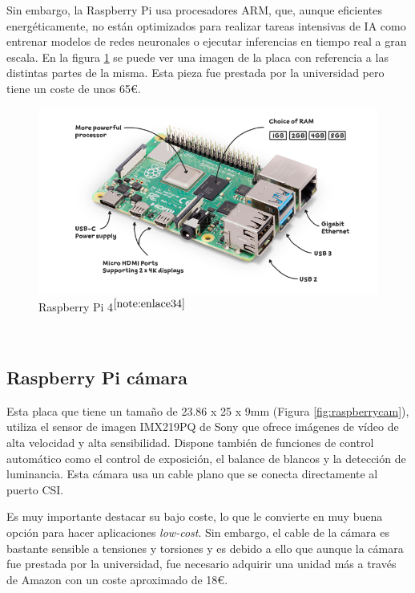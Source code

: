  Sin embargo, la Raspberry Pi usa procesadores ARM, que, aunque eficientes energéticamente, no están optimizados para realizar tareas intensivas de \ac{IA} como entrenar modelos de redes neuronales o ejecutar inferencias en tiempo real a gran escala. En la figura \ref{fig:raspberry} se puede ver una imagen de la placa con referencia a las distintas partes de la misma. Esta pieza fue prestada por la universidad pero tiene un coste de unos 65€. 


\begin{figure} [h!]
	\begin{center}
		\includegraphics[width=14cm]{figs/raspberrypi4.png}
	\end{center}
	\caption{Raspberry Pi 4$^{\ref{note:enlace34}}$} 
\label{fig:raspberry}
\end{figure}\

\setcounter{footnote}{34} %

\subsection{Raspberry Pi cámara}

Esta placa que tiene un tamaño de  23.86 x 25 x 9mm (Figura \ref{fig:raspberrycam}), utiliza el sensor de imagen IMX219PQ de Sony que ofrece imágenes de vídeo de alta velocidad y alta sensibilidad. Dispone también de funciones de control automático como el control de exposición, el balance de blancos y la detección de luminancia. Esta cámara usa un cable plano que se conecta directamente al puerto \ac{CSI}.

Es muy importante destacar su bajo coste, lo que le convierte en muy buena opción para hacer aplicaciones \textit{low-cost}. Sin embargo, el cable de la cámara es bastante sensible a tensiones y torsiones y es debido a ello que aunque la cámara fue prestada por la universidad, fue necesario adquirir una unidad más a través de Amazon con un coste aproximado de 18€.    


